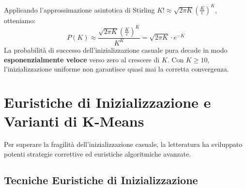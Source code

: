 Applicando l'approssimazione asintotica di Stirling $K! \approx \sqrt{2\pi K} \left(\frac{K}{e}\right)^K$, otteniamo:
\begin{equation}
    P(K) \approx \frac{\sqrt{2\pi K} \left(\frac{K}{e}\right)^K}{K^K} = \sqrt{2\pi K} \cdot e^{-K}
\end{equation}
La probabilità di successo dell'inizializzazione casuale pura decade in modo \textbf{esponenzialmente veloce} verso zero al crescere di $K$. Con $K \ge 10$, l'inizializzazione uniforme non garantisce quasi mai la corretta convergenza.

\section{Euristiche di Inizializzazione e Varianti di K-Means}
\label{sec:dm-kmeans-heuristics-variants}

Per superare la fragilità dell'inizializzazione casuale, la letteratura ha sviluppato potenti strategie correttive ed euristiche algoritmiche avanzate.

\subsection{Tecniche Euristiche di Inizializzazione}

